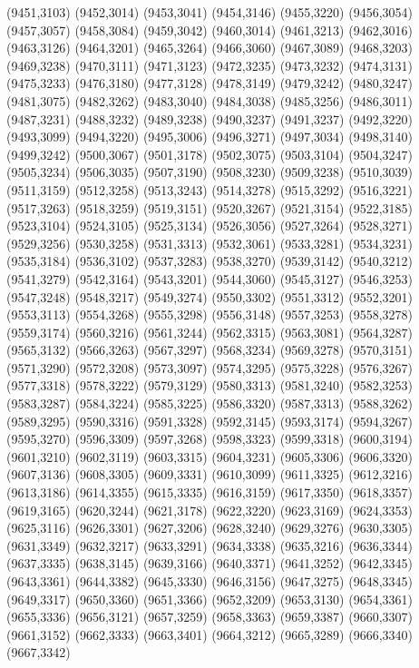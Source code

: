 (9451,3103)
(9452,3014)
(9453,3041)
(9454,3146)
(9455,3220)
(9456,3054)
(9457,3057)
(9458,3084)
(9459,3042)
(9460,3014)
(9461,3213)
(9462,3016)
(9463,3126)
(9464,3201)
(9465,3264)
(9466,3060)
(9467,3089)
(9468,3203)
(9469,3238)
(9470,3111)
(9471,3123)
(9472,3235)
(9473,3232)
(9474,3131)
(9475,3233)
(9476,3180)
(9477,3128)
(9478,3149)
(9479,3242)
(9480,3247)
(9481,3075)
(9482,3262)
(9483,3040)
(9484,3038)
(9485,3256)
(9486,3011)
(9487,3231)
(9488,3232)
(9489,3238)
(9490,3237)
(9491,3237)
(9492,3220)
(9493,3099)
(9494,3220)
(9495,3006)
(9496,3271)
(9497,3034)
(9498,3140)
(9499,3242)
(9500,3067)
(9501,3178)
(9502,3075)
(9503,3104)
(9504,3247)
(9505,3234)
(9506,3035)
(9507,3190)
(9508,3230)
(9509,3238)
(9510,3039)
(9511,3159)
(9512,3258)
(9513,3243)
(9514,3278)
(9515,3292)
(9516,3221)
(9517,3263)
(9518,3259)
(9519,3151)
(9520,3267)
(9521,3154)
(9522,3185)
(9523,3104)
(9524,3105)
(9525,3134)
(9526,3056)
(9527,3264)
(9528,3271)
(9529,3256)
(9530,3258)
(9531,3313)
(9532,3061)
(9533,3281)
(9534,3231)
(9535,3184)
(9536,3102)
(9537,3283)
(9538,3270)
(9539,3142)
(9540,3212)
(9541,3279)
(9542,3164)
(9543,3201)
(9544,3060)
(9545,3127)
(9546,3253)
(9547,3248)
(9548,3217)
(9549,3274)
(9550,3302)
(9551,3312)
(9552,3201)
(9553,3113)
(9554,3268)
(9555,3298)
(9556,3148)
(9557,3253)
(9558,3278)
(9559,3174)
(9560,3216)
(9561,3244)
(9562,3315)
(9563,3081)
(9564,3287)
(9565,3132)
(9566,3263)
(9567,3297)
(9568,3234)
(9569,3278)
(9570,3151)
(9571,3290)
(9572,3208)
(9573,3097)
(9574,3295)
(9575,3228)
(9576,3267)
(9577,3318)
(9578,3222)
(9579,3129)
(9580,3313)
(9581,3240)
(9582,3253)
(9583,3287)
(9584,3224)
(9585,3225)
(9586,3320)
(9587,3313)
(9588,3262)
(9589,3295)
(9590,3316)
(9591,3328)
(9592,3145)
(9593,3174)
(9594,3267)
(9595,3270)
(9596,3309)
(9597,3268)
(9598,3323)
(9599,3318)
(9600,3194)
(9601,3210)
(9602,3119)
(9603,3315)
(9604,3231)
(9605,3306)
(9606,3320)
(9607,3136)
(9608,3305)
(9609,3331)
(9610,3099)
(9611,3325)
(9612,3216)
(9613,3186)
(9614,3355)
(9615,3335)
(9616,3159)
(9617,3350)
(9618,3357)
(9619,3165)
(9620,3244)
(9621,3178)
(9622,3220)
(9623,3169)
(9624,3353)
(9625,3116)
(9626,3301)
(9627,3206)
(9628,3240)
(9629,3276)
(9630,3305)
(9631,3349)
(9632,3217)
(9633,3291)
(9634,3338)
(9635,3216)
(9636,3344)
(9637,3335)
(9638,3145)
(9639,3166)
(9640,3371)
(9641,3252)
(9642,3345)
(9643,3361)
(9644,3382)
(9645,3330)
(9646,3156)
(9647,3275)
(9648,3345)
(9649,3317)
(9650,3360)
(9651,3366)
(9652,3209)
(9653,3130)
(9654,3361)
(9655,3336)
(9656,3121)
(9657,3259)
(9658,3363)
(9659,3387)
(9660,3307)
(9661,3152)
(9662,3333)
(9663,3401)
(9664,3212)
(9665,3289)
(9666,3340)
(9667,3342)
